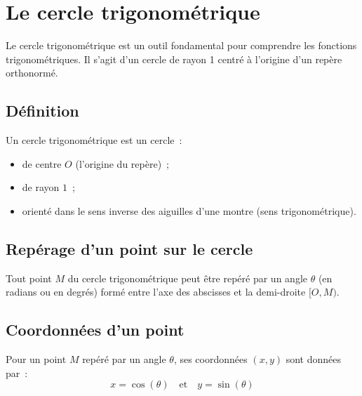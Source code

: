 \documentclass{article}
\begin{document}
\section{Le cercle trigonométrique}

Le cercle trigonométrique est un outil fondamental pour comprendre les fonctions trigonométriques.  
Il s'agit d'un cercle de rayon 1 centré à l'origine d'un repère orthonormé.

\subsection{Définition}  

Un cercle trigonométrique est un cercle~:
\begin{itemize}
    \item de centre $O$ (l'origine du repère)~;  
    \item de rayon $1$~;  
    \item orienté dans le sens inverse des aiguilles d'une montre (sens trigonométrique).  
\end{itemize}

\subsection{Repérage d'un point sur le cercle}

Tout point $M$ du cercle trigonométrique peut être repéré par un angle $\theta$ (en radians ou en degrés) formé entre l'axe des abscisses et la demi-droite  $[O, M)$.


\subsection{Coordonnées d'un point}  
Pour un point $M$ repéré par un angle $\theta$, ses coordonnées $(x, y)$ sont données par~:  
\[  
x = \cos(\theta) \quad \text{et} \quad y = \sin(\theta)
\]
\end{document}
